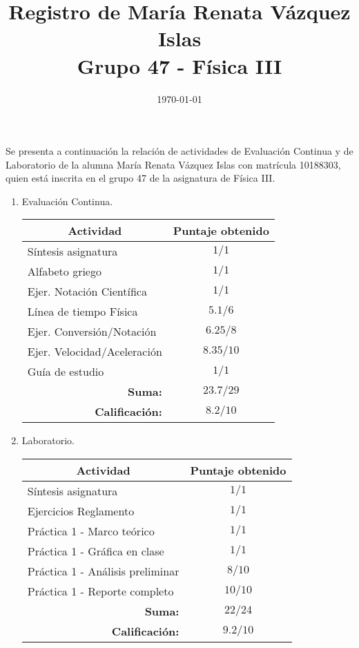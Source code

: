 \documentclass[14pt]{extarticle}
\title{\vspace*{-2cm} Registro de María Renata Vázquez Islas \\  Grupo 47 - Física III \vspace{-5ex}}
\date{\today}
\begin{document}
\maketitle

Se presenta a continuación la relación de actividades de Evaluación Continua y de Laboratorio de la alumna María Renata Vázquez Islas con matrícula 10188303, quien está inscrita en el grupo 47 de la asignatura de Física III.
\begin{enumerate}
\item Evaluación Continua.
\begin{table}[H]
    \centering
    \begin{tabular}{| l | c |} \hline
        \multicolumn{1}{|c|}{\textbf{Actividad}} & \textbf{Puntaje obtenido} \\ \hline
        Síntesis asignatura & $1/1$ \\ \hline
        Alfabeto griego & $1/1$ \\ \hline
        Ejer. Notación Científica & $1/1$ \\ \hline
        Línea de tiempo Física & $5.1/6$ \\ \hline
        Ejer. Conversión/Notación & $6.25/8$ \\ \hline
        Ejer. Velocidad/Aceleración & $8.35/10$ \\ \hline
        Guía de estudio & $1/1$ \\ \hline
        \multicolumn{1}{|r|}{\textbf{Suma:}} & $23.7/29$ \\ \hline
        \multicolumn{1}{|r|}{\textbf{Calificación:}} & $8.2/10$ \\ \hline
    \end{tabular}
\end{table}
\item Laboratorio.
\begin{table}[H]
    \centering
    \begin{tabular}{| l | c |} \hline
        \multicolumn{1}{|c|}{\textbf{Actividad}} & \textbf{Puntaje obtenido} \\ \hline
        Síntesis asignatura & $1/1$ \\ \hline
        Ejercicios Reglamento & $1/1$ \\ \hline
        Práctica 1 - Marco teórico & $1/1$ \\ \hline
        Práctica 1 - Gráfica en clase & $1/1$ \\ \hline
        Práctica 1 - Análisis preliminar & $8/10$ \\ \hline
        Práctica 1 - Reporte completo & $10/10$ \\ \hline
        \multicolumn{1}{|r|}{\textbf{Suma:}} & $22/24$ \\ \hline
        \multicolumn{1}{|r|}{\textbf{Calificación:}} & $9.2/10$ \\ \hline
    \end{tabular}
\end{table}
\end{enumerate}
\newpage
\end{document}
